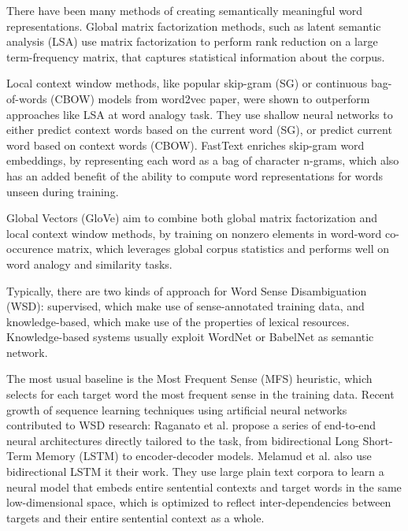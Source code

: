 \documentclass{llncs}
\begin{document}
There have been many methods of creating semantically meaningful word representations.
Global matrix factorization methods, such as latent semantic analysis (LSA)\cite{LSA} use matrix factorization to perform rank reduction on a large term-frequency matrix, that captures statistical information about the corpus.

Local context window methods, like popular skip-gram (SG) or continuous bag-of-words (CBOW) models from word2vec paper\cite{word2vec}, were shown to outperform approaches like LSA at word analogy task.
They use shallow neural networks to either predict context words based on the current word (SG), or predict current word based on context words (CBOW).
FastText\cite{fastText} enriches skip-gram word embeddings, by representing each word as a bag of character n-grams, which also has an added benefit of the ability to compute word representations for words unseen during training.

Global Vectors (GloVe)\cite{GloVe} aim to combine both global matrix factorization and local context window methods, by training on nonzero elements in word-word co-occurence matrix, which leverages global corpus statistics and performs well on word analogy and similarity tasks.

Typically, there are two kinds of approach for Word Sense Disambiguation (WSD): supervised, which make use of sense-annotated training data, and knowledge-based, which make use of the properties of lexical resources.
Knowledge-based systems usually exploit WordNet\cite{wordnet} or BabelNet\cite{babelnet} as semantic network.

The most usual baseline is the Most Frequent Sense\cite{evalmfs} (MFS) heuristic, which selects for each target word the most frequent sense in the training data.
Recent growth of sequence learning techniques using artificial neural networks contributed to WSD research: Raganato et al.\cite{neuralseqmodelingforWSD} propose a series of end-to-end neural architectures directly tailored to the task, from bidirectional Long Short-Term Memory (LSTM) to encoder-decoder models.
Melamud et al.\cite{context2vec} also use bidirectional LSTM it their work. They use large plain text corpora to learn a neural model that embeds entire sentential contexts and target words in the same low-dimensional space, which is optimized to reflect inter-dependencies between targets and their entire sentential context as a whole.
\end{document}
